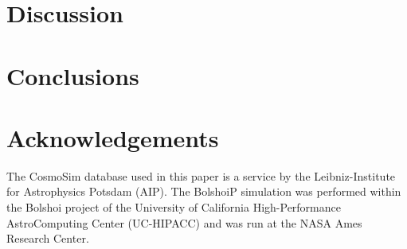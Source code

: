 \documentclass{emulateapj}
\begin{document}
\section{Discussion}
\label{sec:discussion}





\section{Conclusions}
\label{sec:conclusions}





\section*{Acknowledgements}

The CosmoSim database used in this paper is a service by the
Leibniz-Institute for Astrophysics Potsdam (AIP). The  BolshoiP
simulation was performed within the Bolshoi project of the University
of California High-Performance  AstroComputing Center (UC-HIPACC) and
was run at the NASA Ames Research Center. 



 
\end{document}
